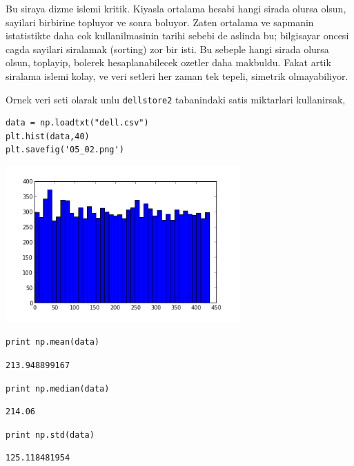\documentclass[12pt,fleqn]{article}\usepackage{../common}
\begin{document}
Bu siraya dizme islemi kritik. Kiyasla ortalama hesabi hangi sirada olursa
olsun, sayilari birbirine topluyor ve sonra boluyor. Zaten ortalama ve
sapmanin istatistikte daha cok kullanilmasinin tarihi sebebi de aslinda bu;
bilgisayar oncesi cagda sayilari siralamak (sorting) zor bir isti. Bu
sebeple hangi sirada olursa olsun, toplayip, bolerek hesaplanabilecek
ozetler daha makbuldu. Fakat artik siralama islemi kolay, ve veri setleri
her zaman tek tepeli, simetrik olmayabiliyor. 

Ornek veri seti olarak unlu \verb!dellstore2! tabanindaki satis miktarlari
kullanirsak, 

\begin{verbatim}
data = np.loadtxt("dell.csv")
plt.hist(data,40)
plt.savefig('05_02.png')
\end{verbatim}

\includegraphics[height=6cm]{05_02.png}

\begin{verbatim}
print np.mean(data)
\end{verbatim}

\begin{verbatim}
213.948899167
\end{verbatim}

\begin{verbatim}
print np.median(data)
\end{verbatim}

\begin{verbatim}
214.06
\end{verbatim}

\begin{verbatim}
print np.std(data)
\end{verbatim}

\begin{verbatim}
125.118481954
\end{verbatim}
\end{document}
